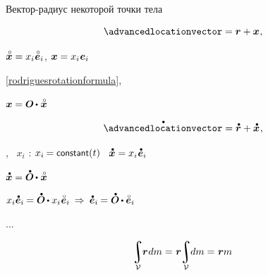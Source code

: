 \foreignlanguage{russian}{Вектор\hbox{-}радиус некоторой точки тела}

\begin{equation*}
\advancedlocationvector = \locationvector + \bm{x}
\hspace{.1ex} ,
\end{equation*}

${\mathcircabove{\bm{x}} = x_i \hspace{.1ex} \mathcircabove{\bm{e}}_i}$,
${\bm{x} = x_i \hspace{.1ex} \bm{e}_i}$

\eqref{rodriguesrotationformula}, 

${\bm{x} = \rotationtensor \hspace{-0.15ex} \dotp \hspace{.1ex} \mathcircabove{\bm{x}}}$

\begin{equation*}
\mathdotabove{\advancedlocationvector} = \mathdotabove{\locationvector} + \mathdotabove{\bm{x}}
\hspace{.1ex} ,
\end{equation*}

, ~${x_i}$ : ${x_i \hspace{-0.16ex} = \constant(t)}$ ~${\mathdotabove{\bm{x}} = x_i \hspace{.1ex} \mathdotabove{\bm{e}}_i}$

${\mathdotabove{\bm{x}} = \mathdotabove{\rotationtensor} \hspace{-0.15ex} \dotp \hspace{.1ex} \mathcircabove{\bm{x}}}$

${x_i \mathdotabove{\bm{e}}_i \hspace{-0.12ex} = \mathdotabove{\rotationtensor} \hspace{-0.15ex} \dotp x_i \hspace{.1ex} \mathcircabove{\bm{e}}_i
\:\Rightarrow\:
\mathdotabove{\bm{e}}_i \hspace{-0.12ex} = \mathdotabove{\rotationtensor} \hspace{-0.15ex} \dotp \mathcircabove{\bm{e}}_i}$

...

\[
\hspace{-0.4ex} \integral_{\mathcal{V}} \hspace{-0.6ex} \locationvector \hspace{.1ex} dm
= \hspace{.1ex} \locationvector \hspace{-0.5ex} \integral_{\mathcal{V}} \hspace{-0.6ex} dm
= \hspace{.1ex} \locationvector m
\]

